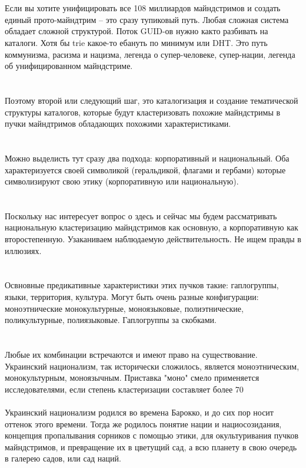 \\
\\
Если вы хотите унифицировать все 108 миллиардов майндстримов и создать единый прото-майндтрим -- это сразу тупиковый путь. Любая сложная система обладает сложной структурой. Поток GUID-ов нужно както разбивать на каталоги. Хотя бы trie какое-то ебануть по минимум или DHT. Это путь коммунизма, расизма и нацизма, легенда о супер-человеке, супер-нации, легенда об унифицированном майндстриме.\\
\\
\\
Поэтому второй или следующий шаг, это каталогизация и создание тематической структуры каталогов, которые будут кластеризовать похожие майндстримы в пучки майндтримов обладающих похожими характеристиками.\\
\\
\\
Можно выделисть тут сразу два подхода: корпоративный и национальный. Оба характеризуется своей символикой (геральдикой, флагами и гербами) которые символизируют свою этику (корпоративную или национальную).\\
\\
\\
Поскольку нас интересует вопрос о здесь и сейчас мы будем рассматривать национальную кластеризацию майндстримов как основную, а корпоративную как второстепенную. Узаканиваем наблюдаемую действительность. Не ищем правды в иллюзиях.\\
\\
\\
Освновные предикативные характеристики этих пучков такие: гаплогруппы, языки, территория, культура. Могут быть очень разные конфигурации: моноэтнические монокультурные, моноязыковые, полиэтнические, поликультурные, полиязыковые. Гаплогруппы за скобками.\\
\\
\\
Любые их комбинации встречаются и имеют право на существование. Украинский национализм, так исторически сложилось, является моноэтническим, монокультурным, моноязычным. Приставка "моно" смело применяется исследователями, если степень кластеризации составляет более 70%
\\
\\
Украинский национализм родился во времена Барокко, и до сих пор носит оттенок этого времени. Тогда же родилось понятие нации и нациосозидания, концепция пропалывания сорников с помощью этики, для окультуривания пучков майндстримов, и превращение их в цветущий сад, а всю планету в свою очередь в галерею садов, или сад наций.\\
